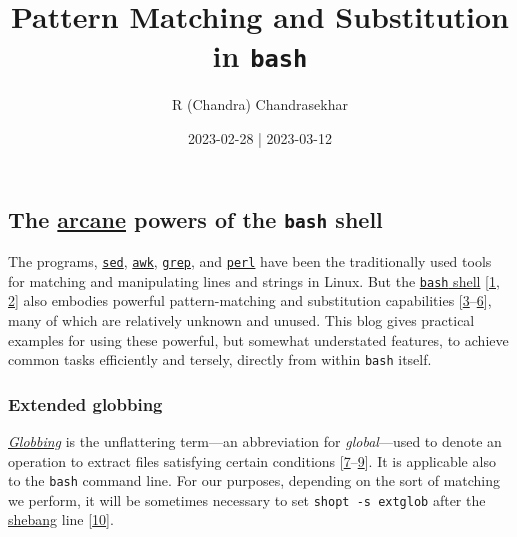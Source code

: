 \documentclass[
  a4paper,
]{article}
\title{Pattern Matching and Substitution in \texttt{bash}}
\author{R (Chandra) Chandrasekhar}
\date{2023-02-28 | 2023-03-12}
\begin{document}
\maketitle

\thispagestyle{empty}


\hypertarget{the-arcane-powers-of-the-bash-shell}{%
\subsection{\texorpdfstring{The
\href{https://www.thefreedictionary.com/arcane}{arcane} powers of the
\texttt{bash}
shell}{The arcane powers of the bash shell}}\label{the-arcane-powers-of-the-bash-shell}}

The programs, \href{https://www.gnu.org/software/sed/}{\texttt{sed}},
\href{https://www.grymoire.com/Unix/Awk.html}{\texttt{awk}},
\href{https://www.gnu.org/software/grep/manual/grep.html}{\texttt{grep}},
and
\href{https://learnbyexample.github.io/learn_perl_oneliners/line-processing.html}{\texttt{perl}}
have been the traditionally used tools for matching and manipulating
lines and strings in Linux. But the
\href{https://www.gnu.org/software/bash/}{\texttt{bash} shell}
{[}\protect\hyperlink{ref-newham2005}{1},
\protect\hyperlink{ref-ryder2018}{2}{]} also embodies powerful
pattern-matching and substitution capabilities
{[}\protect\hyperlink{ref-parametersubs}{3}--\protect\hyperlink{ref-stringops}{6}{]},
many of which are relatively unknown and unused. This blog gives
practical examples for using these powerful, but somewhat understated
features, to achieve common tasks efficiently and tersely, directly from
within \texttt{bash} itself.

\hypertarget{extended-globbing}{%
\subsubsection{Extended globbing}\label{extended-globbing}}

\href{https://en.wikipedia.org/w/index.php?title=Glob_(programming)\&oldid=1133836865}{\emph{Globbing}}
is the unflattering term---an abbreviation for \emph{global}---used to
denote an operation to extract files satisfying certain conditions
{[}\protect\hyperlink{ref-glob2023}{7}--\protect\hyperlink{ref-globhistory}{9}{]}.
It is applicable also to the \texttt{bash} command line. For our
purposes, depending on the sort of matching we perform, it will be
sometimes necessary to set \texttt{shopt\ -s\ extglob} after the
\href{https://en.wikipedia.org/wiki/Shebang_(Unix)}{shebang} line
{[}\protect\hyperlink{ref-extglob}{10}{]}.
\end{document}
